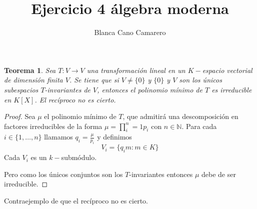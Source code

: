 \documentclass{article}
\title{Ejercicio 4 álgebra moderna}
\author{Blanca Cano Camarero}
\newtheorem*{teorema*}{Teorema}
\newcommand{\N}{\mathbb{N}}
\begin{document}
\maketitle

\begin{teorema*}
    Sea $T:V \longrightarrow V$ una transformación lineal en un $K-$espacio vectorial de dimensión finita $V$.
    Se tiene que si $V \neq \{0\}$ y $\{0\}$ y $V$ son los únicos 
    subespacios $T$-invariantes de $V$, entonces el polinomio mínimo de $T$ es irreducible en $K[X]$. El recíproco no es cierto. 
\end{teorema*}   

\begin{proof}
   Sea $\mu$ el polinomio mínimo de $T$, que admitirá una descomposición en factores irreducibles de la forma
   $\mu = \prod^n_i=1 p_i$ con $n \in \N$. 
   Para cada $i \in \{1, \ldots, n\}$ llamamos  $q_i = \frac{\mu}{p_i}$ y definimos
   \begin{equation*}
       V_i = \{ q_i m : m \in K\}
   \end{equation*}
   Cada $V_i$ es un  $k-$submódulo. 

   Pero como los únicos conjuntos son los $T$-invariantes entonces $\mu$ debe de ser irreducible. 
\end{proof}


Contraejemplo de que el recíproco no es cierto. 
\end{document}
